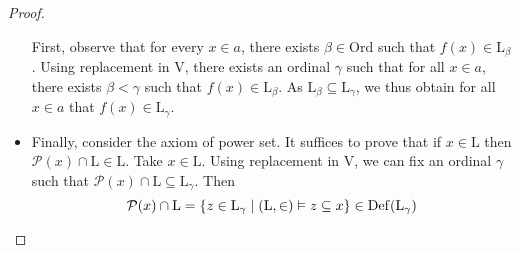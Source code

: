 \begin{proof}
\begin{itemize}
        First, observe that for every \( x \in a \), there exists \( \beta \in \mathrm{Ord} \) such that \( f(x) \in \mathrm{L}_\beta \).
        Using replacement in \( \mathrm{V} \), there exists an ordinal \( \gamma \) such that for all \( x \in a \), there exists \( \beta < \gamma \) such that \( f(x) \in \mathrm{L}_\beta \).
        As \( \mathrm{L}_\beta \subseteq \mathrm{L}_\gamma \), we thus obtain for all \( x \in a \) that \( f(x) \in \mathrm{L}_\gamma \).
        \item Finally, consider the axiom of power set.
        It suffices to prove that if \( x \in \mathrm{L} \) then \( \mathcal P(x) \cap \mathrm{L} \in \mathrm{L} \).
        Take \( x \in \mathrm{L} \).
        Using replacement in \( \mathrm{V} \), we can fix an ordinal \( \gamma \) such that \( \mathcal P(x) \cap \mathrm{L} \subseteq \mathrm{L}_\gamma \).
        Then
        \[ \mathcal P(x) \cap \mathrm{L} = \qty{z \in \mathrm{L}_\gamma \mid (\mathrm{L}, \in) \vDash z \subseteq x} \in \operatorname{Def}(\mathrm{L}_\gamma) \]
    \end{itemize}
\end{proof}

